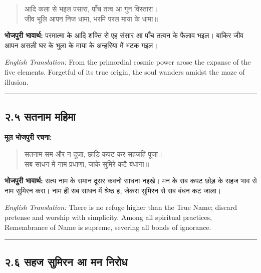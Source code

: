 \begin{quote}
आदि कला से भइल पसारा, पाँच तत्व आ गुन विस्तारा।\\
जीव भूलि आपन निज धामा, भरमि परल माया के धामा॥
\end{quote}

\textbf{भोजपुरी भावार्थ:} परमात्मा के आदि शक्ति से एह संसार आ पाँच तत्वन के फैलाव भइल। बाकिर जीव आपन असली घर के भुला के माया के अन्हरिया में भटक गइल।

\begin{sloppypar}
{\engfont \textit{English Translation:} From the primordial cosmic power arose the expanse of the five elements.
Forgetful of its true origin, the soul wanders amidst the maze of illusion.}
\end{sloppypar}

\begin{center}
{\color{bordercolor}\rule{0.4\textwidth}{0.4pt}}
\end{center}

\subsection*{२.५ सतनाम महिमा}

\textbf{मूल भोजपुरी रचना:}

\begin{quote}
सतनाम सम और न दूजा, छाड़ि कपट कर सहजहिं पूजा।\\
सब साधन में नाम प्रधाणा, जाके सुमिरे कटै बंधाना॥
\end{quote}

\textbf{भोजपुरी भावार्थ:} सत्य नाम के समान दूसर कवनो साधना नइखे। मन के सब कपट छोड़ के सहज भाव से नाम सुमिरन करा। नाम ही सब साधन में श्रेष्ठ ह, जेकरा सुमिरन से सब बंधन कट जाला।

\begin{sloppypar}
{\engfont \textit{English Translation:} There is no refuge higher than the True Name; discard pretense and worship with simplicity.
Among all spiritual practices, Remembrance of Name is supreme, severing all bonds of ignorance.}
\end{sloppypar}

\begin{center}
{\color{bordercolor}\rule{0.4\textwidth}{0.4pt}}
\end{center}

\subsection*{२.६ सहज सुमिरन आ मन निरोध}

